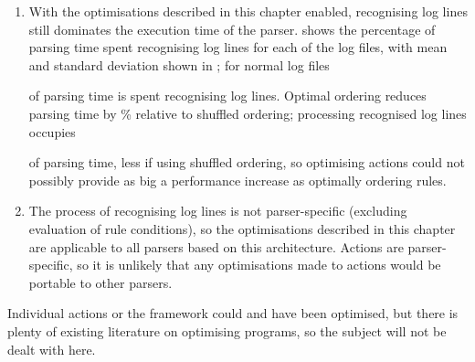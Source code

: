 \begin{enumerate}

    \item With the optimisations described in this chapter enabled,
        recognising log lines still dominates the execution time of the
        parser.   shows the percentage of parsing time spent recognising
        log lines for each of the \numberOFlogFILES{} log files, with mean
        and standard deviation shown in ; for normal log files
        
        of parsing time is spent recognising log lines.  Optimal ordering
        reduces parsing time by
        \%
        relative to shuffled ordering; processing recognised log lines
        occupies
        
        of parsing time, less if using shuffled ordering, so optimising
        actions could not possibly provide as big a performance increase as
        optimally ordering rules.

    \item The process of recognising log lines is not parser-specific
        (excluding evaluation of rule conditions), so the optimisations
        described in this chapter are applicable to all parsers based on
        this architecture.  Actions are parser-specific, so it is unlikely
        that any optimisations made to actions would be portable to other
        parsers.

\end{enumerate}

Individual actions or the framework could and have been optimised, but
there is plenty of existing literature on optimising programs, so the
subject will not be dealt with here.



\FloatBarrier{}

